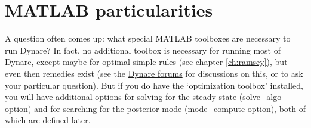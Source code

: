 \section{MATLAB particularities}

A question often comes up: what special MATLAB toolboxes are necessary to run Dynare? In fact, no additional toolbox is necessary for running most of Dynare, except maybe for optimal simple rules (see chapter \ref{ch:ramsey}), but even then remedies exist (see the \href{http://www.dynare.org/phpBB3}{Dynare forums} for discussions on this, or to ask your particular question). But if you do have the `optimization toolbox' installed, you will have additional options for solving for the steady state (solve\_algo option) and for searching for the posterior mode (mode\_compute option), both of which are defined later. 
